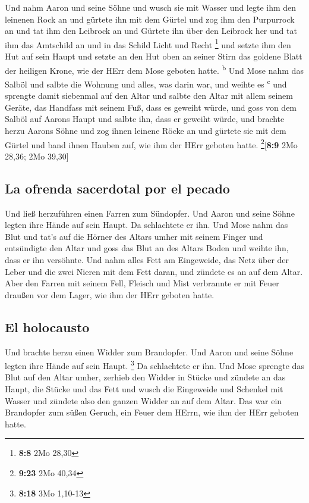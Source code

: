  Und nahm Aaron und seine Söhne und wusch sie mit Wasser
 und legte ihm den leinenen Rock an und gürtete ihn mit
dem Gürtel und zog ihm den Purpurrock an und tat ihm den Leibrock an und
Gürtete ihn über den Leibrock her  und tat ihm das
Amtschild an und in das Schild Licht und Recht \footnote{\textbf{8:8}
  2Mo 28,30}  und setzte ihm den Hut auf sein Haupt und
setzte an den Hut oben an seiner Stirn das goldene Blatt der heiligen
Krone, wie der HErr dem Mose geboten hatte. \textsuperscript{b}
 Und Mose nahm das Salböl und salbte die Wohnung und
alles, was darin war, und weihte es \textsuperscript{c} 
und sprengte damit siebenmal auf den Altar und salbte den Altar mit
allem seinem Geräte, das Handfass mit seinem Fuß, dass es geweiht würde,
 und goss von dem Salböl auf Aarons Haupt und salbte ihn,
dass er geweiht würde,  und brachte herzu Aarons Söhne
und zog ihnen leinene Röcke an und gürtete sie mit dem Gürtel und band
ihnen Hauben auf, wie ihm der HErr geboten hatte.
\footnote{\textbf{9:23} 2Mo 40,34}{[}\textbf{8:9} 2Mo 28,36; 2Mo
39,30{]}

\hypertarget{la-ofrenda-sacerdotal-por-el-pecado}{%
\subsection{La ofrenda sacerdotal por el
pecado}\label{la-ofrenda-sacerdotal-por-el-pecado}}

 Und ließ herzuführen einen Farren zum Sündopfer. Und
Aaron und seine Söhne legten ihre Hände auf sein Haupt. 
Da schlachtete er ihn. Und Mose nahm das Blut und tat's auf die Hörner
des Altars umher mit seinem Finger und entsündigte den Altar und goss
das Blut an des Altars Boden und weihte ihn, dass er ihn versöhnte.
 Und nahm alles Fett am Eingeweide, das Netz über der
Leber und die zwei Nieren mit dem Fett daran, und zündete es an auf dem
Altar.  Aber den Farren mit seinem Fell, Fleisch und Mist
verbrannte er mit Feuer draußen vor dem Lager, wie ihm der HErr geboten
hatte.

\hypertarget{el-holocausto}{%
\subsection{El holocausto}\label{el-holocausto}}

 Und brachte herzu einen Widder zum Brandopfer. Und Aaron
und seine Söhne legten ihre Hände auf sein Haupt. \footnote{\textbf{8:18}
  3Mo 1,10-13}  Da schlachtete er ihn. Und Mose sprengte
das Blut auf den Altar umher,  zerhieb den Widder in
Stücke und zündete an das Haupt, die Stücke und das Fett 
und wusch die Eingeweide und Schenkel mit Wasser und zündete also den
ganzen Widder an auf dem Altar. Das war ein Brandopfer zum süßen Geruch,
ein Feuer dem HErrn, wie ihm der HErr geboten hatte.

